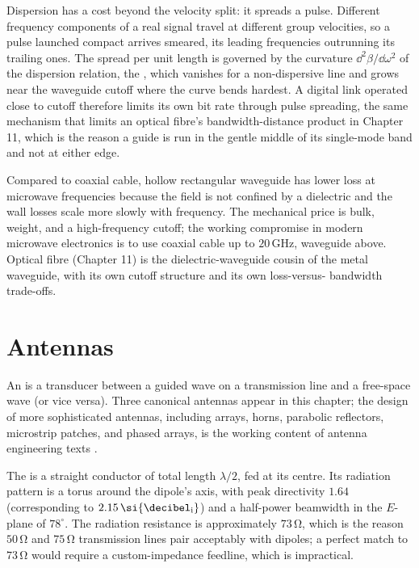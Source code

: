 Dispersion has a cost beyond the velocity split: it spreads a pulse.
Different frequency components of a real signal travel at different group
velocities, so a pulse launched compact arrives smeared, its leading
frequencies outrunning its trailing ones. The spread per unit length is
governed by the curvature $\dd^2\beta/\dd\omega^2$ of the dispersion
relation, the , which vanishes for a
non-dispersive line and grows near the waveguide cutoff where the curve
bends hardest. A digital link operated close to cutoff therefore limits
its own bit rate through pulse spreading, the same mechanism that limits
an optical fibre's bandwidth-distance product in Chapter 11, which is the
reason a guide is run in the gentle middle of its single-mode band and
not at either edge.

Compared to coaxial cable, hollow rectangular waveguide has lower
loss at microwave frequencies because the field is not confined by a
dielectric and the wall losses scale more slowly with frequency. The
mechanical price is bulk, weight, and a high-frequency cutoff; the
working compromise in modern microwave electronics is to use coaxial
cable up to $20\,\si{\giga\hertz}$, waveguide above. Optical fibre
(Chapter 11) is the dielectric-waveguide cousin of the metal
waveguide, with its own cutoff structure and its own loss-versus-
bandwidth trade-offs.

\section{Antennas}

An  is a transducer between a guided wave on a
transmission line and a free-space wave (or vice versa). Three
canonical antennas appear in this chapter; the design of more
sophisticated antennas, including arrays, horns, parabolic reflectors,
microstrip patches, and phased arrays, is the working content of
antenna engineering texts \cite{text:balanis-antennas}.

The  is a straight conductor of total
length $\lambda/2$, fed at its centre. Its radiation pattern is a
torus around the dipole's axis, with peak directivity $1.64$
(corresponding to $2.15\,\si{\decibel\textsubscript{i}}$) and a
half-power beamwidth in the $E$-plane of $78^{\circ}$. The radiation
resistance is approximately $73\,\si{\ohm}$, which is the reason
$50\,\si{\ohm}$ and $75\,\si{\ohm}$ transmission lines pair acceptably
with dipoles; a perfect match to $73\,\si{\ohm}$ would require a
custom-impedance feedline, which is impractical.

